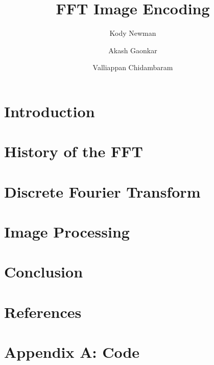 \documentclass[sigplan]{acmart}
\author{Kody Newman}
\author{Akash Gaonkar}
\author{Valliappan Chidambaram}
\title{FFT Image Encoding}
\begin{document}
  \maketitle

  \section{Introduction}
	

  \section{History of the FFT}
	

  \section{Discrete Fourier Transform}
	

  \section{Image Processing}
	

  \section{Conclusion}
	

  \section{References}

	\onecolumn\newpage
	\section{Appendix A: Code}
	
\end{document}
